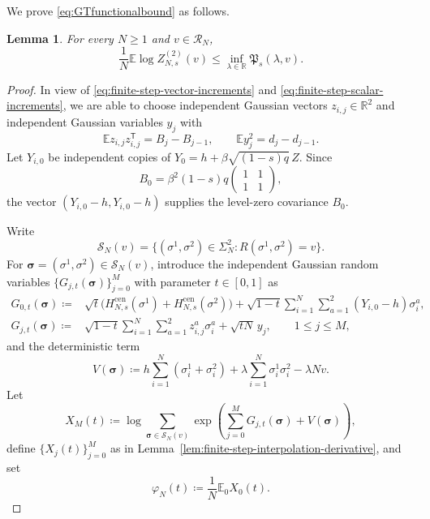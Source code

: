 \documentclass[11pt]{article}
\newtheorem{lemma}[theorem]{Lemma}
\numberwithin{equation}{section}
\newcommand{\E}{\mathbb{E}}
\newcommand{\1}{\mathbf 1}
\begin{document}
We prove \eqref{eq:GTfunctionalbound} as follows.

\begin{lemma}
\label{lem:specialGT}
For every $N\geq1$ and $v\in\mathcal R_N$,
\begin{equation}
\frac1N\E\log Z_{N,s}^{(2)}(v)
\leq\inf_{\lambda\in\mathbb R}\mathfrak P_s(\lambda,v).
\label{eq:appendix-GT-infimum}
\end{equation}
\end{lemma}

\begin{proof}
In view of \eqref{eq:finite-step-vector-increments} and \eqref{eq:finite-step-scalar-increments}, we are able to choose independent Gaussian vectors $z_{i,j}\in\mathbb R^2$ and
independent Gaussian variables $y_j$ with
\[
\E z_{i,j}z_{i,j}^{\mathsf T}=B_j-B_{j-1},
\qquad
\E y_j^2=d_j-d_{j-1}.
\]
Let $Y_{i,0}$ be independent copies of
$Y_0=h+\beta\sqrt{(1-s)q}\,Z$. Since
\[
B_0=\beta^2(1-s)q
\begin{pmatrix}1&1\\1&1\end{pmatrix},
\]
the vector $(Y_{i,0}-h,Y_{i,0}-h)$ supplies the level-zero covariance $B_0$.

Write
\[
{\mathcal{S}}_N(v)=\{(\sigma^1,\sigma^2)\in\Sigma_N^2:
R(\sigma^1,\sigma^2)=v\}.
\]
For $\boldsymbol\sigma=(\sigma^1,\sigma^2)\in{\mathcal{S}}_N(v)$, introduce
the independent Gaussian random variables $\{ G_{j,t}(\boldsymbol\sigma)\} _{j=0}^M$ with parameter $t \in [0,1]$ as
\begin{align*}
G_{0,t}(\boldsymbol\sigma)
\coloneqq {}&\sqrt t\bigl(H_{N,s}^{\mathrm{cen}}(\sigma^1)
+H_{N,s}^{\mathrm{cen}}(\sigma^2)\bigr)+\sqrt{1-t}\sum_{i=1}^N\sum_{a=1}^2
(Y_{i,0}-h)\sigma_i^a,\\
G_{j,t}(\boldsymbol\sigma)
\coloneqq {}&\sqrt{1-t}\sum_{i=1}^N\sum_{a=1}^2z_{i,j}^a\sigma_i^a
+\sqrt{tN}\,y_j,
\qquad 1\leq j\leq M,
\end{align*}
and the deterministic term
\[
V(\boldsymbol\sigma) \coloneqq h\sum_{i=1}^N(\sigma_i^1+\sigma_i^2)
+\lambda\sum_{i=1}^N\sigma_i^1\sigma_i^2-\lambda Nv.
\]
Let
\[
X_M(t) \coloneqq \log\sum_{\boldsymbol\sigma\in{\mathcal{S}}_N(v)}
\exp\left(\sum_{j=0}^MG_{j,t}(\boldsymbol\sigma)
+V(\boldsymbol\sigma)\right),
\]
define $\{ X_j(t)\} _{j=0}^M$ as in Lemma~\ref{lem:finite-step-interpolation-derivative},
and set
\[
\varphi_N(t) \coloneqq \frac1N\E_0X_0(t).
\]


\end{proof}
\end{document}
